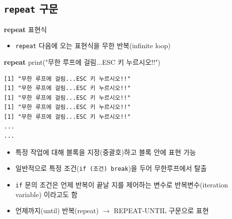 \documentclass[
  11pt,
]{krantz}
\newenvironment{Shaded}{\begin{snugshade}}{\end{snugshade}}
\newcommand{\ControlFlowTok}[1]{\textcolor[rgb]{0.27,0.27,0.27}{\textbf{#1}}}
\newcommand{\FunctionTok}[1]{\textcolor[rgb]{0,0,0}{#1}}
\newcommand{\NormalTok}[1]{#1}
\newcommand{\StringTok}[1]{\textcolor[rgb]{0.5,0.5,0.5}{#1}}
\providecommand{\tightlist}{%
  \setlength{\itemsep}{0pt}\setlength{\parskip}{0pt}}
\begin{document}
\hypertarget{repeat}{%
\subsection{\texorpdfstring{\textbf{\texttt{repeat} 구문}}{repeat 구문}}\label{repeat}}

\footnotesize

\begin{Shaded}
\begin{Highlighting}[]
\ControlFlowTok{repeat}\NormalTok{ 표현식}
\end{Highlighting}
\end{Shaded}

\normalsize

\begin{itemize}
\tightlist
\item
  \texttt{repeat} 다음에 오는 표현식을 무한 반복(infinite loop)
\end{itemize}

\footnotesize

\begin{Shaded}
\begin{Highlighting}[]
\ControlFlowTok{repeat} \FunctionTok{print}\NormalTok{(}\StringTok{"무한 루프에 걸림...ESC 키 누르시오!!"}\NormalTok{)}
\end{Highlighting}
\end{Shaded}

\normalsize

\begin{verbatim}
[1] "무한 루프에 걸림...ESC 키 누르시오!!"
[1] "무한 루프에 걸림...ESC 키 누르시오!!"
[1] "무한 루프에 걸림...ESC 키 누르시오!!"
[1] "무한 루프에 걸림...ESC 키 누르시오!!"
[1] "무한 루프에 걸림...ESC 키 누르시오!!"
...
...
\end{verbatim}

\begin{itemize}
\tightlist
\item
  특정 작업에 대해 블록을 지정(중괄호)하고 블록 안에 표현 가능
\item
  일반적으로 특정 조건(\texttt{if\ (조건)\ break})을 두어 무한루프에서 탈출
\item
  \texttt{if} 문의 조건은 언제 반복이 끝날 지를 제어하는 변수로 반복변수(iteration variable) 이라고도 함
\item
  언제까지(until) 반복(repeat) \(\rightarrow\) REPEAT-UNTIL 구문으로 표현
\end{itemize}

\footnotesize
\end{document}

